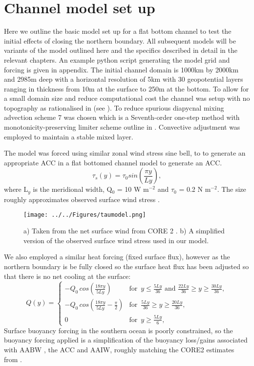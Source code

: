 \section{Channel model set up}
\label{sec:Setup_stand}
Here we outline the basic model set up for a flat bottom channel to test the initial effects of closing the northern boundary. All subsequent models will be variants of the model outlined here and the specifics described in detail in the relevant chapters. An example python script generating the model grid and forcing is given in appendix. %
 The initial channel domain is 1000km by 2000km and 2985m deep with a horizontal resolution of 5km with 30 geopotential layers ranging in thickness from 10m at the surface to 250m at the bottom.
To allow for a small domain size and reduce computational cost the channel was setup with no topography as rationalised in \citet{Abernathey2011} (see ). To reduce spurious diapycnal mixing advection scheme 7 was chosen \citep{hill2012, Ilıcak2012} which is a Seventh-order one-step method with monotonicity-preserving limiter scheme outline in \cite{Daru2004}. Convective adjustment was employed to maintain a stable mixed layer. 

The model was forced using similar zonal wind stress sine bell, to \citet{Abernathey2011} to generate an appropriate ACC in a flat bottomed channel model to generate an ACC.
\begin{equation}
\tau_s(y)=\tau_0 sin(\frac{\pi y}{Ly}),
\label{eq:tau}
\end{equation}
where L$_y$ is the meridional width, Q$_0$ = 10 W m$^{-2}$ and $\tau_0$ = 0.2 N m$^{-2}$. The size roughly approximates observed surface wind stress \cite{Large2009}. 
\begin{figure}[h]
\center
\noindent \texttt{[image: ../../Figures/taumodel.png]} 
\caption{a) Taken from \protect \cite{Abernathey2011} the net surface wind  from CORE 2 \protect \citep{Large2009}. b) A simplified version of the observed surface wind stress used in our model.}
\label{fig:modeltau}
\end{figure}
We also employed a similar heat forcing (fixed surface flux), however as the northern boundary is be fully closed so the surface heat flux has been adjusted so that there is no net cooling at the surface:
\begin{equation}
Q(y)=
\begin{cases}
-Q_{0}\,cos(\frac{18\pi y}{5Ly}) & \text{for }\, y \le \frac{5Ly}{36} \text{ and } \frac{22Ly}{36} \geq y \geq \frac{30Ly}{36},\\
-Q_{0}\,cos(\frac{18 \pi y}{5Ly}-\frac{\pi}{2}) & \text{for }\, \frac{5Ly}{36} \geq y \geq \frac{20Ly}{36},\\
0 & \text{for }\, y \geq \frac{5Ly}{6},
\end{cases}
\label{eq:Q}
\end{equation}
Surface buoyancy forcing in the southern ocean is poorly constrained, \cite{cerovecki2011} so the buoyancy forcing applied is a simplification of the buoyancy loss/gains associated with \gls{AABW} , the ACC and \gls{AAIW}, roughly matching the CORE2 estimates from \cite{Large2009} .

